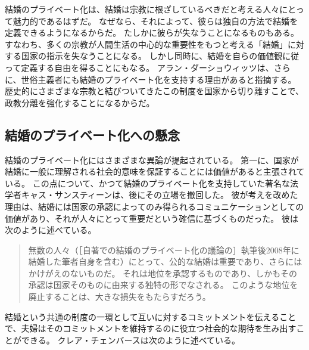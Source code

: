 \documentclass[paper=a4,book,openany]{jlreq}
\begin{document}
結婚のプライベート化は、結婚は宗教に根ざしているべきだと考える人々にとって魅力的であるはずだ。
なぜなら、それによって、彼らは独自の方法で結婚を定義できるようになるからだ。
たしかに彼らが失なうことになるものもある。
すなわち、多くの宗教が人間生活の中心的な重要性をもつと考える「結婚」に対する国家の指示を失なうことになる。
しかし同時に、結婚を自らの価値観に従って定義する自由を得ることにもなる。
アラン・ダーショウィッツは、さらに、世俗主義者にも結婚のプライベート化を支持する理由があると指摘する。
歴史的にさまざまな宗教と結びついてきたこの制度を国家から切り離すことで、政教分離を強化することになるからだ\citep{dershowitz03:_to_fix_gay_dilem_gover}。

\subsection{結婚のプライベート化への懸念}

結婚のプライベート化にはさまざまな異論が提起されている。
第一に、国家が結婚に一般に理解される社会的意味を保証することには価値があると主張されている。
この点について、かつて結婚のプライベート化を支持していた著名な法学者キャス・サンスティーンは、後にその立場を撤回した。
彼が考えを改めた理由は、結婚には国家の承認によってのみ得られるコミュニケーションとしての価値があり、それが人々にとって重要だという確信に基づくものだった。
彼は次のように述べている。

\begin{quote}
無数の人々（［自著での結婚のプライベート化の議論の］執筆後2008年に結婚した筆者自身を含む）にとって、公的な結婚は重要であり、さらにはかけがえのないものだ。
それは地位を承認するものであり、しかもその承認は国家そのものに由来する独特の形でなされる。
このような地位を廃止することは、大きな損失をもたらすだろう。
\citep[p.296]{sunstein17:_statem_i_most_regret}
\end{quote}

結婚という共通の制度の一環として互いに対するコミットメントを伝えることで、夫婦はそのコミットメントを維持するのに役立つ社会的な期待を生み出すことができる。
クレア・チェンバースは次のように述べている。
\end{document}
